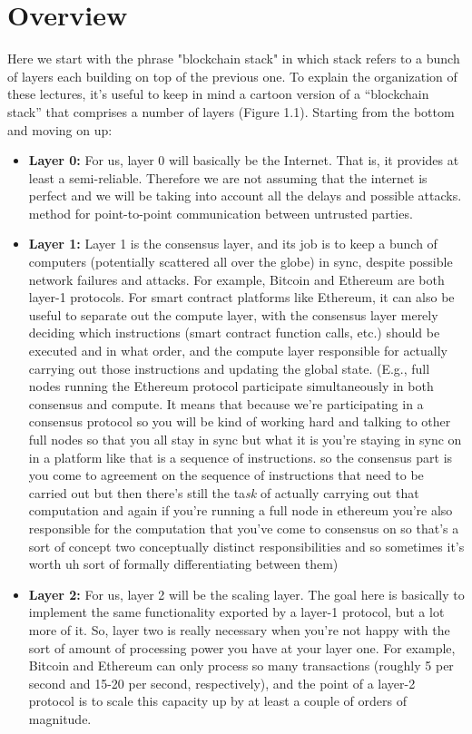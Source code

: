 \section{Overview}
Here we start with the phrase "blockchain stack" in which stack refers to a bunch of layers each building on top of the previous one. To explain the organization of these lectures, it’s useful to keep in mind a cartoon version
of a “blockchain stack” that comprises a number of layers (Figure 1.1). Starting from the bottom and moving on up:\\
\begin{itemize}
    \item \textbf{Layer 0:} For us, layer 0 will basically be the Internet. That is, it provides at least a semi-reliable. Therefore we are not assuming that the internet is perfect and we will be taking into account all the delays and possible attacks.
method for point-to-point communication between untrusted parties.
    \item \textbf{Layer 1:} Layer 1 is the consensus  layer, and its job is to keep a bunch of computers (potentially
    scattered all over the globe) in sync, despite possible network failures and attacks.
    For example, Bitcoin and Ethereum are both layer-1 protocols. For smart contract
    platforms like Ethereum, it can also be useful to separate out the compute layer, with
    the consensus layer merely deciding which instructions (smart contract function calls,
    etc.) should be executed and in what order, and the compute layer responsible for
    actually carrying out those instructions and updating the global state. (E.g., full
    nodes running the Ethereum protocol participate simultaneously in both consensus
    and compute. It means that because we're participating in a consensus protocol so you will be kind
    of working hard and talking to other
    full nodes so that you all stay in sync
    but what it is you're staying in sync on
    in a platform like that is a sequence of
    instructions. so the consensus
    part is you come to agreement on the
    sequence of instructions that need to be
    carried out but then there's still the
    ta\textit{sk} of actually carrying out that
    computation and again if you're running
    a full node in ethereum you're also
    responsible for the computation that
    you've come to consensus on so that's a
    sort of concept two conceptually
    distinct responsibilities and so
    sometimes it's worth uh sort of formally
    differentiating between them)
    \item \textbf{Layer 2:} For us, layer 2 will be the scaling layer. The goal here is basically to implement the
    same functionality exported by a layer-1 protocol, but a lot more of it. So, layer two is really necessary when you're not happy
    with the sort of amount of processing
    power you have
    at your layer one.
    For example,
    Bitcoin and Ethereum can only process so many transactions (roughly 5 per second
    and 15-20 per second, respectively), and the point of a layer-2 protocol is to scale this capacity up by at least a couple of orders of magnitude.


\end{itemize}
